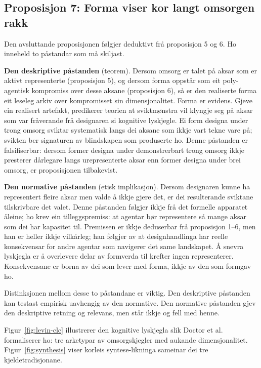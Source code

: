 \subsection{Proposisjon 7: Forma viser kor langt omsorgen rakk}

Den avsluttande proposisjonen følgjer deduktivt frå proposisjon 5 og 6. Ho inneheld to påstandar som må skiljast.

\textbf{Den deskriptive påstanden} (teorem). Dersom omsorg er talet på aksar som er aktivt representerte (proposisjon 5), og dersom forma oppstår som eit poly-agentisk kompromiss over desse aksane (proposisjon 6), så er den realiserte forma eit leseleg arkiv over kompromisset sin dimensjonalitet. Forma er evidens. Gjeve ein realisert artefakt, predikerer teorien at sviktmønstra vil klyngje seg på aksar som var fråverande frå designaren si kognitive lyskjegle. Ei form designa under trong omsorg sviktar systematisk langs dei aksane som ikkje vart tekne vare på; svikten ber signaturen av blindskapen som produserte ho. Denne påstanden er falsifiserbar: dersom former designa under demonstrerbart trong omsorg ikkje presterer dårlegare langs urepresenterte aksar enn former designa under brei omsorg, er proposisjonen tilbakevist.

\textbf{Den normative påstanden} (etisk implikasjon). Dersom designaren kunne ha representert fleire aksar men valde å ikkje gjere det, er dei resulterande sviktane tilskrivbare det valet. Denne påstanden følgjer ikkje frå det formelle apparatet åleine; ho krev ein tilleggspremiss: at agentar bør representere så mange aksar som dei har kapasitet til. Premissen er ikkje deduserbar frå proposisjon 1--6, men han er heller ikkje vilkårleg; han følgjer av at designhandlinga har reelle konsekvensar for andre agentar som navigerer det same landskapet. Å snevra lyskjegla er å overlevere delar av formverda til krefter ingen representerer. Konsekvensane er borna av dei som lever med forma, ikkje av den som formgav ho.

Distinksjonen mellom desse to påstandane er viktig. Den deskriptive påstanden kan testast empirisk uavhengig av den normative. Den normative påstanden gjev den deskriptive retning og relevans, men står ikkje og fell med henne.

Figur~\ref{fig:levin-clc} illustrerer den kognitive lyskjegla slik Doctor et al. formaliserer ho: tre arketypar av omsorgskjegler med aukande dimensjonalitet. Figur~\ref{fig:synthesis} viser korleis syntese-likninga sameinar dei tre kjeldetradisjonane.

